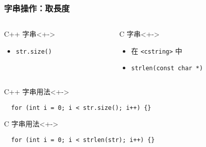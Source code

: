 \documentclass[utf8]{beamer}
\begin{document}
\begin{CJK}{UTF8}{bkai}
\begin{frame}[fragile]
  \frametitle{字串操作：取長度}
  \begin{columns}[T]
    \begin{column}[T]{5.5cm}
    \begin{block}{C++ 字串}<+->
      \begin{itemize}
      \item \lstinline{str.size()}{}
      \end{itemize}
    \end{block}
    \end{column}
    \begin{column}[T]{5.5cm}
    \begin{block}{C 字串}<+->
      \begin{itemize}[<+->]
      \item 在 \lstinline{<cstring>}{} 中
      \item \lstinline{strlen(const char *)}{}
      \end{itemize}
    \end{block}
    \end{column}
  \end{columns}
  \begin{exampleblock}{C++ 字串用法}<+->
    \begin{lstlisting}
  for (int i = 0; i < str.size(); i++) {}
    \end{lstlisting}
  \end{exampleblock}
  \begin{exampleblock}{C 字串用法}<+->
    \begin{lstlisting}
  for (int i = 0; i < strlen(str); i++) {}
    \end{lstlisting}
  \end{exampleblock}
\end{frame}


\end{CJK}
\end{document}
